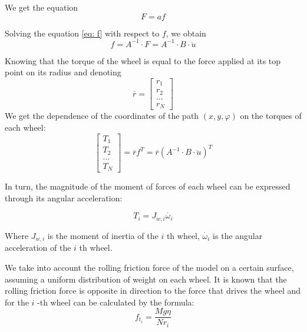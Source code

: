 \documentclass[oneside,final,14pt]{extreport}
\begin{document}
We get the equation
\begin{equation}
F = af
\label{eq: f}
\end{equation}

Solving the equation \ref{eq: f} with respect to $ f $, we obtain
\begin{equation}
f
=
A ^{- 1}
\cdot
F
=
A ^{- 1}
\cdot
B
\cdot
\ddot{u}
\end{equation}

Knowing that the torque of the wheel is equal to the force applied at its top point on its radius and denoting
\begin{equation}
\overline{r}
=
\begin{bmatrix}
r_{1} \\
r_{2} \\
... \\
r_{N}
\end{bmatrix}
\end{equation}
We get the dependence of the coordinates of the path $ (x, y, \varphi) $ on the torques of each wheel:
\begin{equation}
\label{eq: dynamic_w_friction}
\begin{bmatrix}
T_{1} \\
T_{2} \\
... \\
T_{N}
\end{bmatrix}
=
\overline{r}
f ^{T}
=
\overline{r}
(
A ^{- 1}
\cdot
B
\cdot
\ddot{u}
) ^{T}
\end{equation}

In turn, the magnitude of the moment of forces of each wheel can be expressed through its angular acceleration:

\begin{equation}
T_{i}
=
J_{w, i} \dot{\omega_{i}}
\end{equation}

Where $ J_{w, i} $ is the moment of inertia of the $ i $ th wheel, $ \dot{\omega_{i}} $ is the angular acceleration of the $ i $ th wheel.

We take into account the rolling friction force of the model on a certain surface, assuming a uniform distribution of weight on each wheel. It is known that the rolling friction force is opposite in direction to the force that drives the wheel and for the $ i $ -th wheel can be calculated by the formula:
\begin{equation}
f_{t_{i}}
=
\frac{Mg \eta}{Nr_{i}}
\end{equation}
\end{document}
